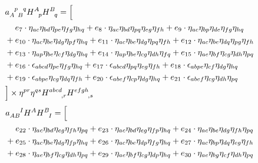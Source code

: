 \begin{itemize}
{\begin{minipage}[t]{\linewidth}
\begin{equation}\label{ansatz_ApBq}
  \begin{aligned}
    & a_{A\hphantom{p}B}^{\hphantom Ap\hphantom Bq} H^A_{\hphantom Ap} H^B_{\hphantom Bq} = \Big\lbrack \\
    & \hphantom{{}+{}} e_{7} \cdot \eta_{a c} \eta_{b d} \eta_{p e} \eta_{f g} \eta_{h q} + e_{8} \cdot \eta_{a c} \eta_{b d} \eta_{p q} \eta_{e g} \eta_{f h} + e_{9} \cdot \eta_{a c} \eta_{b p} \eta_{d e} \eta_{f g} \eta_{h q} \\
    & + e_{10} \cdot \eta_{a c} \eta_{b e} \eta_{d g} \eta_{p f} \eta_{h q} + e_{11} \cdot \eta_{a c} \eta_{b e} \eta_{d g} \eta_{p q} \eta_{f h} + e_{12} \cdot \eta_{a c} \eta_{b e} \eta_{d q} \eta_{p g} \eta_{f h} \\
    & + e_{13} \cdot \eta_{a p} \eta_{b e} \eta_{c f} \eta_{d g} \eta_{h q} + e_{14} \cdot \eta_{a p} \eta_{b e} \eta_{c g} \eta_{d h} \eta_{f q} + e_{15} \cdot \eta_{a e} \eta_{b f} \eta_{c g} \eta_{d h} \eta_{p q} \\
    & + e_{16} \cdot \epsilon_{a b c d} \eta_{p e} \eta_{f g} \eta_{h q} + e_{17} \cdot \epsilon_{a b c d} \eta_{p q} \eta_{e g} \eta_{f h} + e_{18} \cdot \epsilon_{a b p e} \eta_{c f} \eta_{d g} \eta_{h q} \\
    & + e_{19} \cdot \epsilon_{a b p e} \eta_{c g} \eta_{d q} \eta_{f h} + e_{20} \cdot \epsilon_{a b e f} \eta_{c p} \eta_{d g} \eta_{h q} + e_{21} \cdot \epsilon_{a b e f} \eta_{c g} \eta_{d h} \eta_{p q} \\
    & \Big\rbrack \times \eta^{pr} \eta^{qs} H^{abcd}_{\hphantom{abcd},r} H^{efgh}_{\hphantom{efgh},s}
  \end{aligned}
\end{equation}
\begin{equation}\label{ansatz_ABI}
  \begin{aligned}
    & a_{AB}^{\hphantom{AB}I} H^A H^B_{\hphantom BI} = \Big\lbrack \\
    & \hphantom{{}+{}} e_{22} \cdot \eta_{a c} \eta_{b d} \eta_{e g} \eta_{f h} \eta_{p q} + e_{23} \cdot \eta_{a c} \eta_{b d} \eta_{e g} \eta_{f p} \eta_{h q} + e_{24} \cdot \eta_{a c} \eta_{b e} \eta_{d g} \eta_{f h} \eta_{p q} \\
    & + e_{25} \cdot \eta_{a c} \eta_{b e} \eta_{d g} \eta_{f p} \eta_{h q} + e_{26} \cdot \eta_{a c} \eta_{b e} \eta_{d p} \eta_{f g} \eta_{h q} + e_{27} \cdot \eta_{a c} \eta_{b p} \eta_{d q} \eta_{e g} \eta_{f h} \\
    & + e_{28} \cdot \eta_{a e} \eta_{b f} \eta_{c g} \eta_{d h} \eta_{p q} + e_{29} \cdot \eta_{a e} \eta_{b f} \eta_{c g} \eta_{d p} \eta_{h q} + e_{30} \cdot \eta_{a e} \eta_{b g} \eta_{c f} \eta_{d h} \eta_{p q} \\

\end{aligned}
\end{equation}
\end{minipage}}
\end{itemize}
